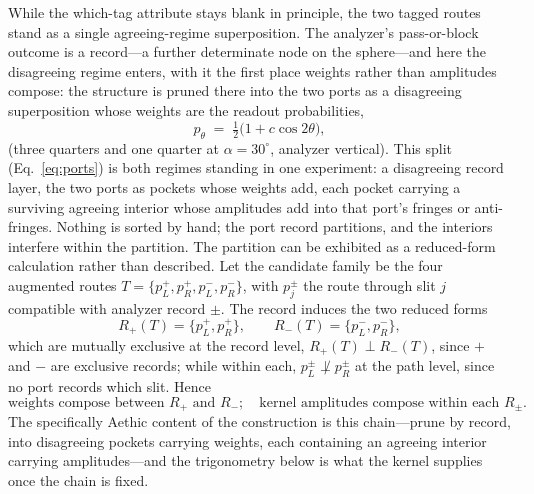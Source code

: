 


While the which-tag attribute stays blank in principle, the two tagged routes stand as a single agreeing-regime superposition. The analyzer's pass-or-block outcome is a record---a further determinate node on the sphere---and here the disagreeing regime enters, with it the first place weights rather than amplitudes compose: the structure is pruned there into the two ports as a disagreeing superposition whose weights are the readout probabilities,
\begin{equation}\label{eq:ports}
p_\theta \;=\; \tfrac{1}{2}\big(1 + c \cos 2\theta\big),
\end{equation}
(three quarters and one quarter at $\alpha = 30^\circ$, analyzer vertical). This split (Eq.~\eqref{eq:ports}) is both regimes standing in one experiment: a disagreeing record layer, the two ports as pockets whose weights add, each pocket carrying a surviving agreeing interior whose amplitudes add into that port's fringes or anti-fringes. Nothing is sorted by hand; the port record partitions, and the interiors interfere within the partition. The partition can be exhibited as a reduced-form calculation rather than described. Let the candidate family be the four augmented routes $T = \{p_L^{+}, p_R^{+}, p_L^{-}, p_R^{-}\}$, with $p_j^{\pm}$ the route through slit $j$ compatible with analyzer record $\pm$. The record induces the two reduced forms
\begin{equation}\label{eq:ledger}
R_{+}(T) = \{p_L^{+}, p_R^{+}\}, \qquad R_{-}(T) = \{p_L^{-}, p_R^{-}\},
\end{equation}
which are mutually exclusive at the record level, $R_{+}(T) \perp R_{-}(T)$, since $+$ and $-$ are exclusive records; while within each, $p_L^{\pm} \not\perp p_R^{\pm}$ at the path level, since no port records which slit. Hence
\[
\boxed{\text{weights compose between } R_{+} \text{ and } R_{-}; \quad \text{kernel amplitudes compose within each } R_{\pm}.}
\]
The specifically Aethic content of the construction is this chain---prune by record, into disagreeing pockets carrying weights, each containing an agreeing interior carrying amplitudes---and the trigonometry below is what the kernel supplies once the chain is fixed. 

